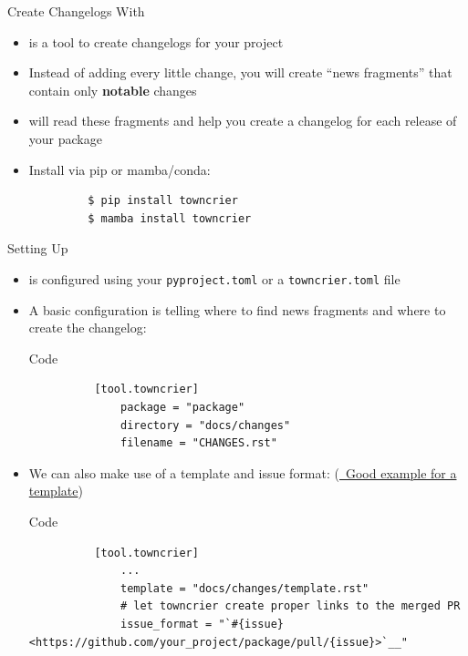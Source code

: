 \begin{frame}[fragile]{
    Create Changelogs With \tc
    \hfill
  }
  \begin{itemize}
    \setlength{\itemsep}{1.5em}
    \item \tc{} is a tool to create changelogs for your project
    \item Instead of adding every little change, you will create \enquote{news fragments}
      that contain only \textbf{notable} changes
    \item \tc{} will read these fragments and help you create a changelog for each release
      of your package
    \item Install \tc{} via pip or mamba/conda:
      \begin{verbatim}
         $ pip install towncrier
         $ mamba install towncrier
      \end{verbatim}

  \end{itemize}
\end{frame}

\begin{frame}[fragile]{Setting Up \tc}
  \begin{itemize}
    \setlength{\itemsep}{1.5em}
    \item \tc{} is configured using your \texttt{pyproject.toml} or a \texttt{towncrier.toml} file
    \item A basic configuration is telling \tc{} where to find news fragments and where to
      create the changelog:
      \begin{block}{Code}
        \begin{verbatim}
          [tool.towncrier]
              package = "package"
              directory = "docs/changes"
              filename = "CHANGES.rst"
        \end{verbatim}
      \end{block}
    \item We can also make use of a template and issue format:
      (\href{https://github.com/astropy/astropy/blob/main/docs/changes/template.rst}{\faExternalLink*~Good example for a template})
      \begin{block}{Code}
        \begin{verbatim}
          [tool.towncrier]
              ...
              template = "docs/changes/template.rst"
              # let towncrier create proper links to the merged PR
              issue_format = "`#{issue} <https://github.com/your_project/package/pull/{issue}>`__"
        \end{verbatim}
      \end{block}
  \end{itemize}
\end{frame}

